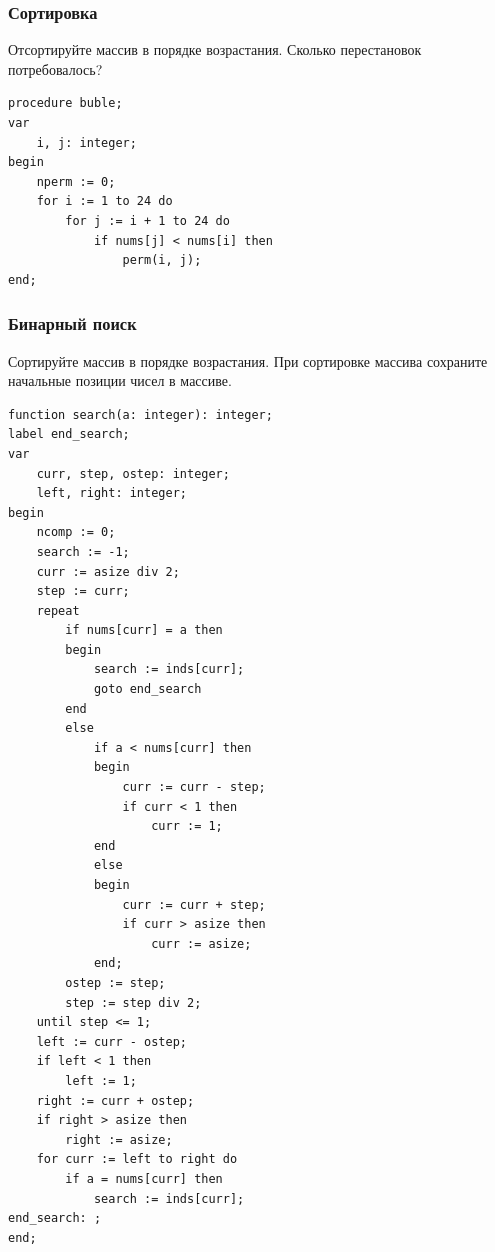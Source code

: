\documentclass[10,a4paper]{article}
\begin{document}
\subsubsection{Сортировка}
Отсортируйте массив в порядке возрастания. Сколько перестановок
потребовалось?
\begin{lstlisting}
procedure buble;
var
    i, j: integer;
begin
    nperm := 0;
    for i := 1 to 24 do
        for j := i + 1 to 24 do
            if nums[j] < nums[i] then
                perm(i, j);
end;
\end{lstlisting}
\subsubsection{Бинарный поиск}
Сортируйте массив в порядке возрастания.
При сортировке массива сохраните начальные позиции чисел в массиве.
\begin{lstlisting}
function search(a: integer): integer;
label end_search;
var
    curr, step, ostep: integer;
    left, right: integer;
begin
    ncomp := 0;
    search := -1;
    curr := asize div 2;
    step := curr;
    repeat
        if nums[curr] = a then
        begin
            search := inds[curr];
            goto end_search
        end
        else
            if a < nums[curr] then
            begin
                curr := curr - step;
                if curr < 1 then
                    curr := 1;
            end
            else
            begin
                curr := curr + step;
                if curr > asize then
                    curr := asize;
            end;
        ostep := step;
        step := step div 2;
    until step <= 1;
    left := curr - ostep;
    if left < 1 then
        left := 1;
    right := curr + ostep;
    if right > asize then
        right := asize;
    for curr := left to right do
        if a = nums[curr] then
            search := inds[curr];
end_search: ;
end;
\end{lstlisting}
\end{document}
